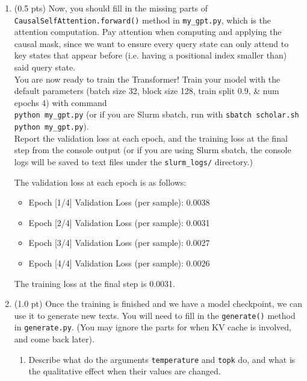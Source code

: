 \begin{enumerate}
\item (0.5 pts)
Now, you should fill in the missing parts of \texttt{CausalSelfAttention.forward()} method in \texttt{my\_gpt.py}, which is the attention computation. Pay attention when computing and applying the causal mask, since we want to ensure every query state can only attend to key states that appear before (i.e. having a positional index smaller than) said query state. \\
You are now ready to train the Transformer! Train your model with the default parameters (batch size 32, block size 128, train split 0.9, \& num epochs 4) with command \\
\texttt{python my\_gpt.py}
(or if you are Slurm sbatch, run with \texttt{sbatch scholar.sh python my\_gpt.py}). \\
Report the validation loss at each epoch, and the training loss at the final step from the console output (or if you are using Slurm sbatch, the console logs will be saved to text files under the \texttt{slurm\_logs/} directory.)
\begin{answerbox}[2in]
    The validation loss at each epoch is as follows:
    \begin{itemize}
        \item Epoch [1/4] Validation Loss (per sample): 0.0038
        \item Epoch [2/4] Validation Loss (per sample): 0.0031
        \item Epoch [3/4] Validation Loss (per sample): 0.0027
        \item Epoch [4/4] Validation Loss (per sample): 0.0026

    \end{itemize}
    The training loss at the final step is 0.0031.
    \end{answerbox}

\item (1.0 pt)
Once the training is finished and we have a model checkpoint, we can use it to generate new texts. You will need to fill in the \texttt{generate()} method in \texttt{generate.py}.  (You may ignore the parts for when KV cache is involved, and come back later).
\begin{enumerate}
    \item 

    Describe what do the arguments \texttt{temperature} and \texttt{topk} do,
    and what is the qualitative effect when their values are changed.


\end{enumerate}
\end{enumerate}

